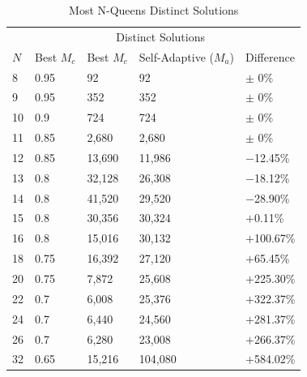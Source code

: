 \documentclass[conference]{IEEEtran}
\begin{document}
\begin{table}\label{table:distinctsol}
\centering
\caption{Most N-Queens Distinct Solutions}
\begin{tabular}{|l|l|l|l|l|} \hline
&               &  \multicolumn{2}{c|}{Distinct Solutions}& \\ \cline{3-4}
$N$&  Best $M_{c}$&  Best $M_{c}$&    Self-Adaptive ($M_{a}$)&    Difference\\ \hline
8&  0.95&          92&              92&                         $\pm$ 0\% \\ \hline                        
9&  0.95&          352&             352&                        $\pm$ 0\% \\ \hline
10& 0.9&           724&             724&                        $\pm$ 0\% \\ \hline
11& 0.85&          2,680&           2,680&                      $\pm$ 0\% \\ \hline
12& 0.85&          13,690&          11,986&                     $-$12.45\% \\ \hline
13& 0.8&           32,128&          26,308&                     $-$18.12\% \\ \hline
14& 0.8&           41,520&          29,520&                     $-$28.90\% \\ \hline
15& 0.8&           30,356&          30,324&                     $+$0.11\% \\ \hline
16& 0.8&           15,016&          30,132&                     $+$100.67\% \\ \hline
18& 0.75&          16,392&          27,120&                     $+$65.45\% \\ \hline
20& 0.75&          7,872&           25,608&                     $+$225.30\% \\ \hline
22& 0.7&           6,008&           25,376&                     $+$322.37\% \\ \hline
24& 0.7&           6,440&           24,560&                     $+$281.37\% \\ \hline
26& 0.7&           6,280&           23,008&                     $+$266.37\% \\ \hline
32& 0.65&          15,216&          104,080&                    $+$584.02\% \\ \hline
\end{tabular}
\end{table}
\end{document}
